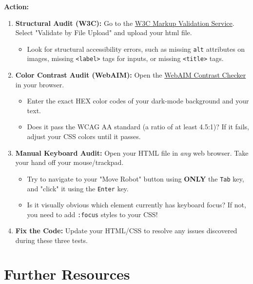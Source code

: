 \documentclass[a4paper,12pt]{article}
\begin{document}
\vspace{0.3cm}
\textbf{Action:}
\begin{enumerate}
    \item \textbf{Structural Audit (W3C):} Go to the \href{https://validator.w3.org/#validate_by_upload}{W3C Markup Validation Service}. Select "Validate by File Upload" and upload your html file. 
    \begin{itemize}
        \item Look for structural accessibility errors, such as missing \texttt{alt} attributes on images, missing \texttt{<label>} tags for inputs, or missing \texttt{<title>} tags.
    \end{itemize}
    \item \textbf{Color Contrast Audit (WebAIM):} Open the \href{https://webaim.org/resources/contrastchecker/}{WebAIM Contrast Checker} in your browser. 
    \begin{itemize}
        \item Enter the exact HEX color codes of your dark-mode background and your text. 
        \item Does it pass the WCAG AA standard (a ratio of at least 4.5:1)? If it fails, adjust your CSS colors until it passes.
    \end{itemize}
    \item \textbf{Manual Keyboard Audit:} Open your HTML file in \textit{any} web browser. Take your hand off your mouse/trackpad.
    \begin{itemize}
        \item Try to navigate to your "Move Robot" button using \textbf{ONLY} the \texttt{Tab} key, and "click" it using the \texttt{Enter} key. 
        \item Is it visually obvious which element currently has keyboard focus? If not, you need to add \texttt{:focus} styles to your CSS!
    \end{itemize}
    \item \textbf{Fix the Code:} Update your HTML/CSS to resolve any issues discovered during these three tests.
\end{enumerate}


\section*{Further Resources}
\end{document}
